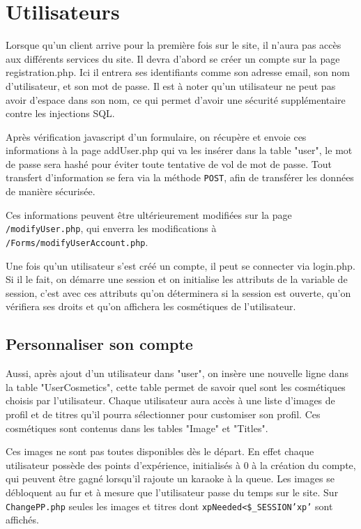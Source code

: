 \section{Utilisateurs}

Lorsque qu'un client arrive pour la première fois sur le site, il n'aura pas accès aux différents services du site. Il devra d'abord se créer un compte sur la page registration.php. Ici il entrera ses 
identifiants comme son adresse email, son nom d'utilisateur, et son mot de passe.
Il est à noter qu'un utilisateur ne peut pas avoir d'espace dans son nom, ce qui permet d'avoir une sécurité supplémentaire contre les injections SQL.

Après vérification javascript d'un formulaire, on récupère et envoie ces informations à la page addUser.php qui va les insérer dans la table "user", le mot de passe sera hashé pour éviter toute tentative de vol de mot de passe. Tout transfert d'information se fera via la méthode \texttt{POST}, afin de transférer les données de manière sécurisée.

Ces informations peuvent être  ultérieurement modifiées sur la page \texttt{/modifyUser.php}, qui enverra les modifications à \texttt{/Forms/modifyUserAccount.php}.

Une fois qu'un utilisateur s'est créé un compte, il peut se connecter via login.php. Si il le fait, on démarre une session et on initialise les attributs de la variable de session, c'est avec ces attributs qu'on déterminera si la session est ouverte, qu'on vérifiera ses droits et qu'on affichera les cosmétiques de l'utilisateur.

\subsection{Personnaliser son compte}

Aussi, après ajout d'un utilisateur dans "user", on insère une nouvelle ligne dans la table "UserCosmetics", cette table permet de savoir quel sont les cosmétiques choisis par l'utilisateur.  
Chaque utilisateur aura accès à une liste d'images de profil et de titres qu'il pourra sélectionner pour customiser son profil. Ces cosmétiques sont contenus dans les tables "Image" et "Titles".

Ces images ne sont pas toutes disponibles dès le départ. En effet chaque utilisateur possède des points d'expérience, initialisés à 0 à la création du compte, qui peuvent être gagné lorsqu'il rajoute un karaoke à la queue. Les images se débloquent au fur et à mesure que l'utilisateur passe du temps sur le site. Sur \texttt{ChangePP.php} seules les images et titres dont \texttt{xpNeeded<\$\_SESSION\lbrack'xp'\rbrack} sont affichés.\newline

